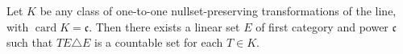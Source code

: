 Let $K$ be any class of one-to-one nullset-preserving transformations of the line, with $\operatorname{card} K = \mathfrak{c}$. Then there exists a linear set $E$ of first category and power $\mathfrak{c}$ such that $TE \triangle E$ is a countable set for each $T \in K$.
